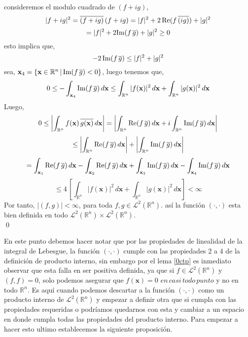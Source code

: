 \documentclass[12pt]{book}
\numberwithin{equation}{chapter}
\def\ol{\overline}
\def\R{\mathbb{R}}
\def\L{\mathcal{L}}
\def\x{\mathbf{x}}
\begin{document}
consideremos el modulo cuadrado de $(f + ig)$,
$$ |f + ig|^{2} = \ol{(f+ig)}\, (f+ig)= |f|^{2} + 2\, \hbox{Re}(f\, \ol{(ig)}) +|g|^{2} $$
$$ = |f|^{2} + 2 \hbox{Im}(f\,\ol{g}) + |g|^{2} \geq 0 $$
esto implica que,
$$ -2\, \hbox{Im}(f\, \ol{g}) \leq |f|^{2} + |g|^{2} $$
sea, $\x_{4}= \{ \x \in \R^{n} \,|\,  \hbox{Im}(f\, \ol{g}) <0 \} $, luego tenemos que,
$$ 0 \leq - \int_{\x_{4}} \hbox{Im}(f\, \ol{g}) \, d\x \leq \int_{\R^{n}} |f(\x)|^{2}\, d\x  + \int_{\R^{n}} |g(\x)|^{2}\, d\x $$
Luego,
$$ 0 \leq \left| \int_{\R^{n}} f(\x) \, \ol{g(\x)} \, d\x \right| = \left| \int_{\R^{n}} \hbox{Re}(f\, \ol{g})\, d\x + i \int_{\R^{n}} \hbox{Im}(f\, \ol{g})\, d\x \right| $$
$$\leq \left| \int_{\R^{n}} \hbox{Re}(f\, \ol{g})\, d\x \right| + \left| \int_{\R^{n}} \hbox{Im}(f\, \ol{g})\, d\x \right| $$
$$= \int_{\x_{1}} \hbox{Re}(f\, \ol{g}) \, d\x - \int_{\x_{2}} \hbox{Re}(f\, \ol{g}) \, d\x + \int_{\x_{3}} \hbox{Im}(f\, \ol{g}) \, d\x - \int_{\x_{4}} \hbox{Im}(f\, \ol{g}) \, d\x  $$
$$ \leq 4\, \left[ \int_{\R^{n}} |f(\x)|^{2} \, d\x + \int_{\R^{n}} |g(\x)|^{2} \, d\x \right] < \infty $$
Por tanto, $ |(f,g)|< \infty $, para toda $f,g \in \L^{2}(\R^{n})$. as\'i la funci\'on $(\cdot , \cdot)$ esta bien definida en todo $\L^{2}(\R^{n}) \times \L^{2}(\R^{n})$. \\ \qed

\vspace{5 mm}

En este punto debemos hacer notar que por las propiedades de linealidad de la integral de Lebesgue, la funci\'on $(\cdot , \cdot)$ cumple con las propiedades 2 a 4 de la definici\'on de producto interno, sin embargo por el lema \ref{0ctp} es inmediato observar que esta falla en ser positiva definida, ya que si $f \in \L^{2}(\R^{n})$ y $(f,f)=0$, solo podemos asegurar que $f(\x) =0 $ $en \, casi \, todo \,punto$ y no en todo $\R^{n}$. Es aqu\'i cuando podemos descartar a la funci\'on $(\cdot , \cdot)$ como un producto interno de $\L^{2}(\R^{n})$ y empezar a definir otra que si cumpla con las propiedades requeridas o podr\'iamos quedarnos con esta y cambiar a un espacio en donde cumpla todas las propiedades del producto interno. Para empezar a hacer esto ultimo establecemos la siguiente proposici\'on.

\vspace{5 mm}
\end{document}
